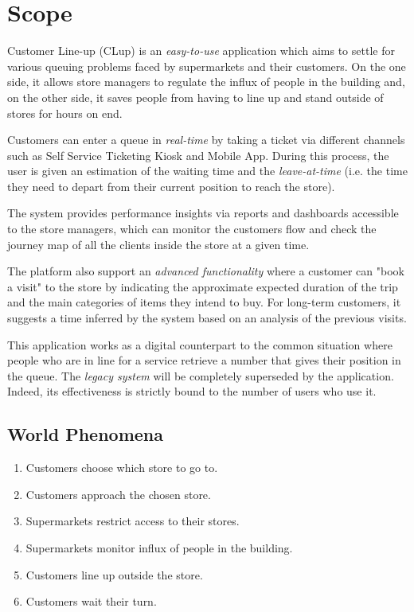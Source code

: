 \section{Scope}
Customer Line-up (CLup) is an \textit{easy-to-use} application which aims to settle for various queuing problems faced by supermarkets and their customers.\newline
On the one side, it allows store managers to regulate the influx of people in the building and, on the other side, it saves people from having to line up and stand outside of stores for hours on end.

Customers can enter a queue in \textit{real-time} by taking a ticket via different channels such as Self Service Ticketing Kiosk and Mobile App. During this process, the user is given an estimation of the waiting time and the \textit{leave-at-time} (i.e. the time they need to depart from their current position to reach the store).

The system provides performance insights via reports and dashboards accessible to the store managers, which can monitor the customers flow and check the journey map of all the clients inside the store at a given time.

The platform also support an \textit{advanced functionality} where a customer can "book a visit" to the store by indicating the approximate expected duration of the trip and the main categories of items they intend to buy. For long-term customers, it suggests a time inferred by the system based on an analysis of the previous visits. 

This application works as a digital counterpart to the common situation where people who are in line for a service retrieve a number that gives their position in the queue. The \textit{legacy system} will be completely superseded by the application. Indeed, its effectiveness is strictly bound to the number of users who use it.

\subsection{World Phenomena}
\begin{enumerate}[label=\textbf{WP.\arabic*}]
	\item Customers choose which store to go to.
	\item Customers approach the chosen store.
	\item Supermarkets restrict access to their stores.
	\item Supermarkets monitor influx of people in the building.
	\item Customers line up outside the store.
	\item Customers wait their turn.
\end{enumerate}

